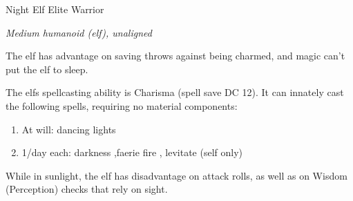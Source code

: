 \begin{monsterbox}{Night Elf Elite Warrior}
	\begin{hangingpar}
		\textit{Medium humanoid (elf), unaligned}
	\end{hangingpar}
	\dndline%
	\basics[%
	armorclass = 18,
	hitpoints  = 71,
	speed      = 30 ft
	]
	\dndline%
	\stats[
	STR = \stat{13}, %
	DEX = \stat{18},
	CON = \stat{14},
	INT = \stat{11},
	WIS = \stat{13},
	CHA = \stat{12}
	]
	\dndline%
	\details[%
	savingthrows = {Dex +7, Con +5, Wis +4},
	skills = {Perception +4, Stealth +10},
	senses = {darkvision 120 ft., passive perception 14},
	languages = {Elvish, undercommon, common},
	challenge = 5 (1800 XP)
	]
	\dndline%
	\begin{monsteraction}
		The elf has advantage on saving throws against being charmed, and magic can't put the elf to sleep.
	\end{monsteraction}	
	\begin{monsteraction}
		The elfs spellcasting ability is Charisma (spell save DC 12). It can innately cast the following spells, requiring no material components:
		\begin{enumerate}
			\item At will: dancing lights
			\item 1/day each: darkness ,faerie fire , levitate (self only)
		\end{enumerate}
	\end{monsteraction}	
	\begin{monsteraction}
		While in sunlight, the elf has disadvantage on attack rolls, as well as on Wisdom (Perception) checks that rely on sight.
	\end{monsteraction}	
	

\end{monsterbox}
